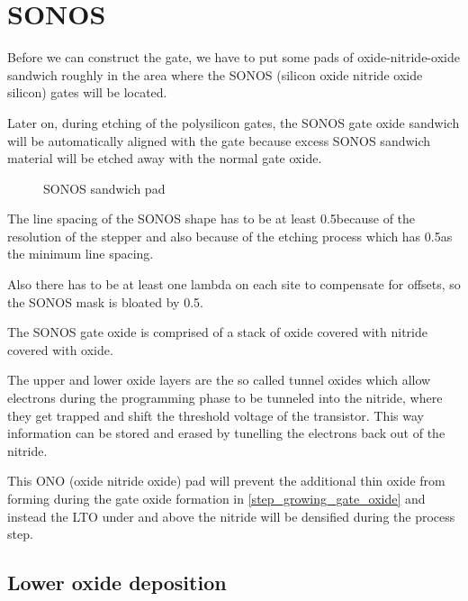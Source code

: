 \section{SONOS}\label{sonos_chapter}

Before we can construct the gate, we have to put some pads of oxide-nitride-oxide sandwich roughly in the area where the SONOS (silicon oxide nitride oxide silicon) gates will be located.

Later on, during etching of the polysilicon gates, the SONOS gate oxide sandwich will be automatically aligned with the gate because excess SONOS sandwich material will be etched away with the normal gate oxide.

\begin{figure}[H]
	\centering
	\begin{tikzpicture}[node distance = 3cm, auto, thick,scale=\CrossAndTopSectionBig, every node/.style={transform shape}]
		
	\end{tikzpicture}
	\caption{SONOS sandwich pad}
\end{figure}

The line spacing of the SONOS shape has to be at least 0.5\um because of the resolution of the stepper and also because of the etching process which has 0.5\um as the minimum line spacing.

Also there has to be at least one lambda on each site to compensate for offsets, so the SONOS mask is bloated by 0.5\um.

The SONOS gate oxide is comprised of a stack of oxide covered with nitride covered with oxide.

The upper and lower oxide layers are the so called tunnel oxides which allow electrons during the programming phase to be tunneled into the nitride, where they get trapped and shift the threshold
voltage of the transistor. This way information can be stored and erased by tunelling the electrons back out of the nitride.

This ONO (oxide nitride oxide) pad will prevent the additional thin oxide from forming during the gate oxide formation in \autoref{step_growing_gate_oxide} and instead the LTO under and above the nitride
will be densified during the process step.

\newpage

\subsection{Lower oxide deposition}\label{step_depositing_sonos_lower_lto}

